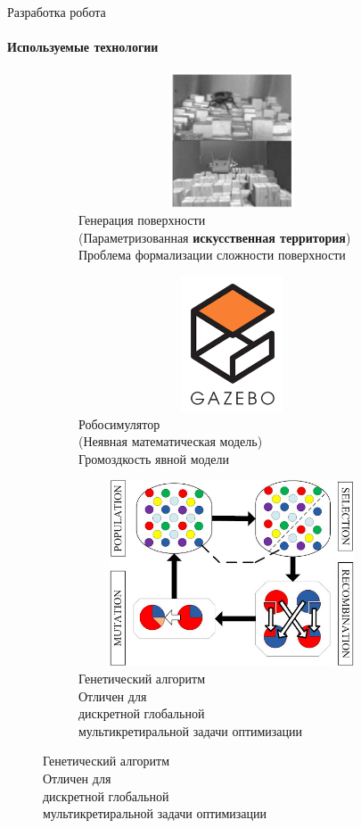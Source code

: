 \documentclass[aspectratio=169,xcolor=table]{beamer}
\begin{document}
\begin{frame}[c]{Разработка робота}
    \framesubtitle{Используемые технологии}
    \vspace{-0.7cm}
    \begin{figure}[H]
        \begin{subfigure}[t]{0.32\textwidth}
            \centering\includegraphics[height=4cm,width=1\textwidth,keepaspectratio]{c1_paper.png}
            \caption*{\small Генерация поверхности \\ (Параметризованная \textbf{искусственная территория}) \\ \alert{Проблема формализации сложности поверхности}}
        \end{subfigure}
        \hfill
        \begin{subfigure}[t]{0.32\textwidth}
            \centering\includegraphics[height=4cm,width=1\textwidth,keepaspectratio]{gazebo_logo.png}
            \caption*{\small Робосимулятор \\ (Неявная математическая модель) \\ \alert{Громоздкость явной модели}}
        \end{subfigure}
        \hfill
        \begin{subfigure}[t]{0.32\textwidth}
            \centering\includegraphics[height=5.5cm,width=1\textwidth,keepaspectratio]{gen_algo.jpg}
            \caption*{ \small Генетический алгоритм \\ \alert{Отличен для \\ дискретной глобальной \\ мультикретиральной задачи оптимизации}}
        \end{subfigure}
        \hfill
    \end{figure}
\end{frame}
\end{document}
